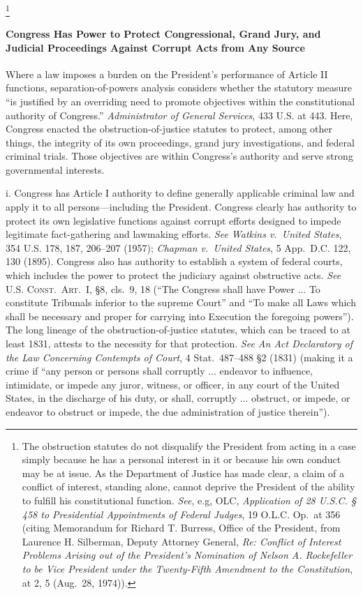 \footnote{The obstruction statutes do not disqualify the President from acting in a case simply because he has a personal interest in it or because his own conduct may be at issue.
As the Department of Justice has made clear, a claim of a conflict of interest, standing alone, cannot deprive the President of the ability to fulfill his constitutional function.
\textit{See}, e.g, OLC, \textit{Application of 28 U.S.C. § 458 to Presidential Appointments of Federal Judges}, 19 O.L.C. Op.\ at 356 (citing Memorandum for Richard T. Burress, Office of the President, from Laurence H. Silberman, Deputy Attorney General, \textit{Re: Conflict of Interest Problems Arising out of the President's Nomination of Nelson A. Rockefeller to be Vice President under the Twenty-Fifth Amendment to the Constitution}, at 2, 5 (Aug.~28, 1974)).}

\paragraph{Congress Has Power to Protect Congressional, Grand Jury, and Judicial Proceedings Against Corrupt Acts from Any Source}

Where a law imposes a burden on the President’s performance of Article II functions, separation-of-powers analysis considers whether the statutory measure “is justified by an overriding need to promote objectives within the constitutional authority of Congress.”
\textit{Administrator of General Services}, 433 U.S. at 443.
Here, Congress enacted the obstruction-of-justice statutes to protect, among other things, the integrity of its own proceedings, grand jury investigations, and federal criminal trials.
Those objectives are within Congress’s authority and serve strong governmental interests.

i. Congress has Article I authority to define generally applicable criminal law and apply it to all persons---including the President.
Congress clearly has authority to protect its own legislative functions against corrupt efforts designed to impede legitimate fact-gathering and lawmaking efforts.
\textit{See Watkins v.\ United States}, 354 U.S. 178, 187, 206--207 (1957);
\textit{Chapman v.\ United States}, 5 App.\ D.C. 122, 130 (1895).
Congress also has authority to establish a system of federal courts, which includes the power to protect the judiciary against obstructive acts.
\textit{See} \textsc{U.S. Const.\ Art.~I}, \S 8, cls.~9, 18 (“The Congress shall have Power ... To constitute Tribunals inferior to the supreme Court” and “To make all Laws which shall be necessary and proper for carrying into Execution the foregoing powers”).
The long lineage of the obstruction-of-justice statutes, which can be traced to at least 1831, attests to the necessity for that protection.
\textit{See An Act Declaratory of the Law Concerning Contempts of Court}, 4 Stat.~487--488 \S 2 (1831) (making it a crime if “any person or persons shall corruptly ... endeavor to influence, intimidate, or impede any juror, witness, or officer, in any court of the United States, in the discharge of his duty, or shall, corruptly ... obstruct, or impede, or endeavor to obstruct or impede, the due administration of justice therein”).

